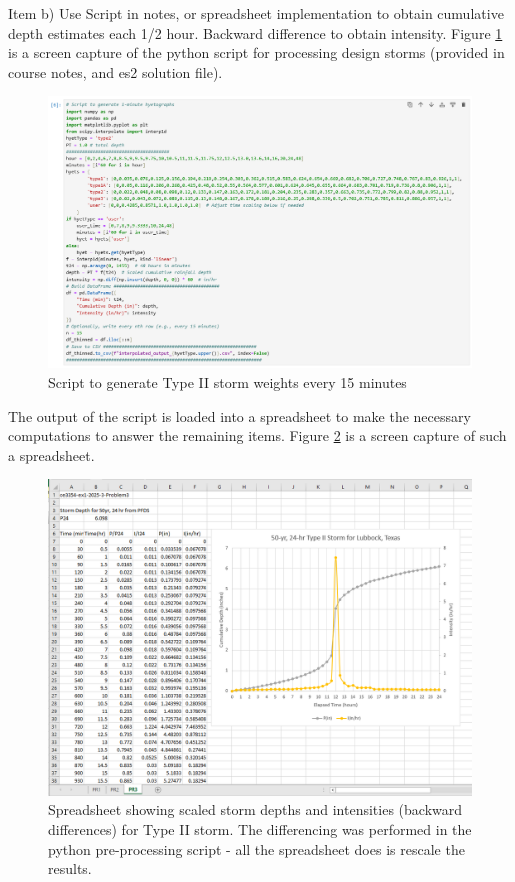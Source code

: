 \documentclass[12pt]{article}
\begin{document}
\begin{enumerate}
\clearpage
Item b) Use Script in notes, or spreadsheet implementation to obtain cumulative depth estimates each 1/2 hour.  Backward difference to obtain intensity.  Figure \ref{fig:pr3_script} is a screen capture of the python script for processing design storms (provided in course notes, and es2 solution file).

\begin{figure}[h!] %
   \centering
   \includegraphics[width=5in]{pr3_script.png} 
   \caption{Script to generate Type II storm weights every 15 minutes}
   \label{fig:pr3_script}
\end{figure}

The output of the script is loaded into a spreadsheet to make the necessary computations to answer the remaining items.  Figure \ref{fig:pr3_xls} is a screen capture of such a spreadsheet.

\begin{figure}[h!] %
   \centering
   \includegraphics[width=5in]{pr3_xls.png} 
   \caption{Spreadsheet showing scaled storm depths and intensities (backward differences) for Type II storm. The differencing was performed in the python pre-processing script - all the spreadsheet does is rescale the results.}
   \label{fig:pr3_xls}
\end{figure}


\end{enumerate}
\end{document}
